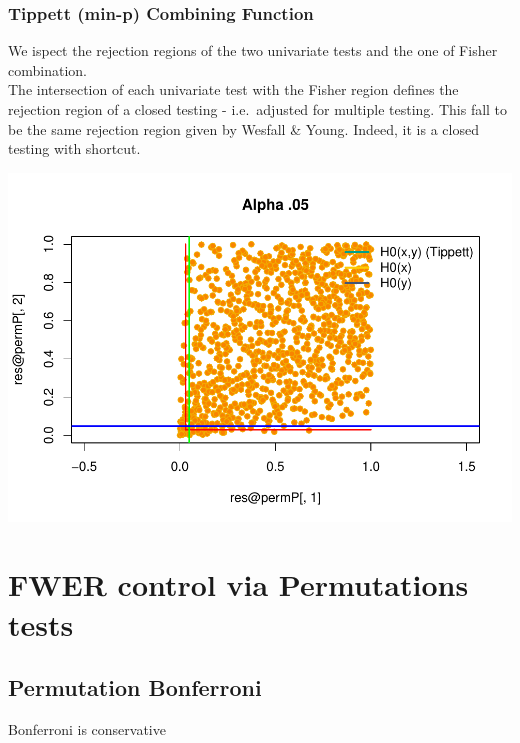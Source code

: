 \documentclass[
]{article}
\begin{document}
\hypertarget{tippett-min-p-combining-function}{%
\subsubsection{Tippett (min-p) Combining
Function}\label{tippett-min-p-combining-function}}

We ispect the rejection regions of the two univariate tests and the one
of Fisher combination.\\
The intersection of each univariate test with the Fisher region defines
the rejection region of a closed testing - i.e.~adjusted for multiple
testing. This fall to be the same rejection region given by Wesfall \&
Young. Indeed, it is a closed testing with shortcut.

\begin{center}\includegraphics{perm_files/figure-latex/unnamed-chunk-38-1} \end{center}

\hypertarget{fwer-control-via-permutations-tests}{%
\section{FWER control via Permutations
tests}\label{fwer-control-via-permutations-tests}}

\hypertarget{permutation-bonferroni}{%
\subsection{Permutation Bonferroni}\label{permutation-bonferroni}}

Bonferroni is conservative
\end{document}
